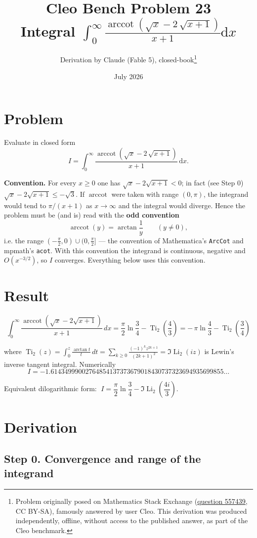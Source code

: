 \documentclass[11pt]{article}
\title{Cleo Bench Problem 23\\[1ex]\large Integral $\int_0^\infty\frac{\operatorname{arccot}\left(\sqrt{x}-2\,\sqrt{x+1}\right)}{x+1}\mathrm dx$}
\author{Derivation by Claude (Fable 5), closed-book\thanks{Problem originally
posed on Mathematics Stack Exchange
(\href{https://math.stackexchange.com/q/557439}{question 557439}, CC BY-SA),
famously answered by user Cleo. This derivation was produced independently,
offline, without access to the published answer, as part of the Cleo benchmark.}}
\date{July 2026}
\theoremstyle{remark}
\begin{document}
\maketitle

\section*{Problem}

Evaluate in closed form
\[I=\int_0^\infty\frac{\operatorname{arccot}\!\left(\sqrt{x}-2\,\sqrt{x+1}\right)}{x+1}\,\mathrm dx .\]

\textbf{Convention.} For every $x\ge 0$ one has $\sqrt x-2\sqrt{x+1}<0$; in fact (see Step 0) $\sqrt x-2\sqrt{x+1}\le-\sqrt3$. If $\operatorname{arccot}$ were taken with range $(0,\pi)$, the integrand would tend to $\pi/(x+1)$ as $x\to\infty$ and the integral would diverge. Hence the problem must be (and is) read with the \textbf{odd convention}
\[\operatorname{arccot}(y)=\arctan\frac1y\qquad(y\neq0),\]
i.e. the range $(-\tfrac\pi2,0)\cup(0,\tfrac\pi2]$ --- the convention of Mathematica's \texttt{ArcCot} and mpmath's \texttt{acot}. With this convention the integrand is continuous, negative and $O(x^{-3/2})$, so $I$ converges. Everything below uses this convention.

\section*{Result}

\[\boxed{\;\int_0^\infty\frac{\operatorname{arccot}\!\left(\sqrt{x}-2\sqrt{x+1}\right)}{x+1}\,dx
=\frac{\pi}{2}\ln\frac34-\operatorname{Ti}_2\!\left(\frac43\right)
=-\,\pi\ln\frac43-\operatorname{Ti}_2\!\left(\frac34\right)\;}\]

where $\operatorname{Ti}_2(z)=\displaystyle\int_0^z\frac{\arctan t}{t}\,dt=\sum_{k\ge0}\frac{(-1)^k z^{2k+1}}{(2k+1)^2}=\Im\operatorname{Li}_2(iz)$ is Lewin's inverse tangent integral. Numerically
\[I=-1.61434999002764854137373679018430737323694935699855\ldots\]

Equivalent dilogarithmic form: $\;I=\dfrac{\pi}{2}\ln\dfrac34-\Im\operatorname{Li}_2\!\left(\dfrac{4i}{3}\right).$

\section*{Derivation}

\subsection*{Step 0. Convergence and range of the integrand}
\end{document}
